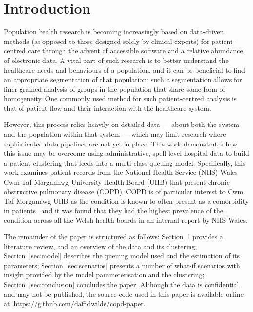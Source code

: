 \section{Introduction}\label{sec:intro}

Population health research is becoming increasingly based on data-driven methods
(as opposed to those designed solely by clinical experts) for patient-centred
care through the advent of accessible software and a relative abundance of
electronic data. A vital part of such research is to better understand the
healthcare needs and behaviours of a population, and it can be beneficial to
find an appropriate segmentation of that population; such a segmentation allows
for finer-grained analysis of groups in the population that share some form of
homogeneity. One commonly used method for such patient-centred analysis is that
of patient flow and their interaction with the healthcare system.

However, this process relies heavily on detailed data --- about both the system
and the population within that system --- which may limit research where
sophisticated data pipelines are not yet in place. This work demonstrates how
this issue may be overcome using administrative, spell-level hospital data to
build a patient clustering that feeds into a multi-class queuing model.
Specifically, this work examines patient records from the National Health
Service (NHS) Wales Cwm Taf Morgannwg University Health Board (UHB) that present
chronic obstructive pulmonary disease (COPD). COPD is of particular interest to
Cwm Taf Morgannwg UHB as the condition is known to often present as a
comorbidity in patients~\cite{Houben2019} and it was found that they had the
highest prevalence of the condition across all the Welsh health boards in an
internal report by NHS Wales.



The remainder of the paper is structured as follows: Section~\ref{sec:intro}
provides a literature review, and an overview of the data and its clustering;
Section~\ref{sec:model} describes the queuing model used and the estimation of
its parameters; Section~\ref{sec:scenarios} presents a number of what-if
scenarios with insight provided by the model parameterisation and the
clustering; Section~\ref{sec:conclusion} concludes the paper. Although the data
is confidential and may not be published, the source code used in this paper is
available online at~\url{https://github.com/daffidwilde/copd-paper}.

